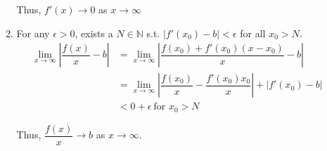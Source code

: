 \documentclass[12pt]{article}
\begin{document}
\begin{enumerate}
\begin{enumerate}
        Thus, $f'(x) \to 0$ as $x\to \infty$

        \newpage
        \item For any $\epsilon > 0$, exists a $N\in\mathbb{N}$ s.t. $|f'(x_0) - b| < \epsilon$ for all $x_0 > N$.\begin{align*}
            \displaystyle\lim_{x\to\infty}|\dfrac{f(x)}{x} - b| &= \displaystyle\lim_{x\to\infty}|\dfrac{f(x_0) + f'(x_0)(x-x_0)}{x} - b|\\
            &=\displaystyle\lim_{x\to\infty} |\dfrac{f(x_0)}{x} - \dfrac{f'(x_0)x_0}{x}| + |f'(x_0) - b|\\
            &< 0 + \epsilon\ \text{for } x_0 > N
        \end{align*}

        Thus, $\dfrac{f(x)}{x} \to b$ as $x\to\infty$.
    \end{enumerate}
\end{enumerate}
\end{document}
